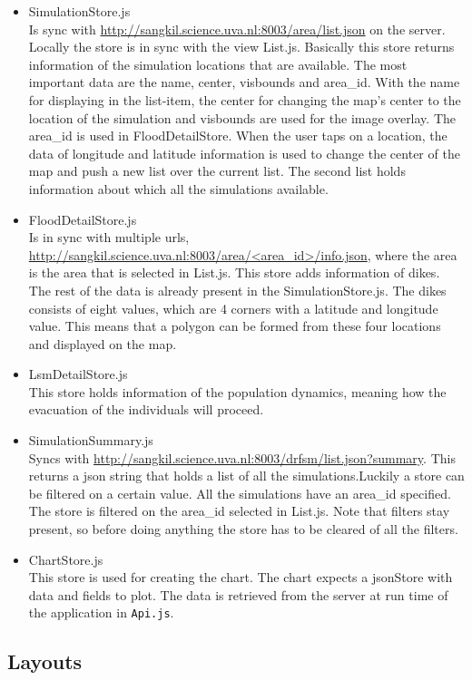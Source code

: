 \begin{itemize}
\item SimulationStore.js \\
Is sync with \url{http://sangkil.science.uva.nl:8003/area/list.json} on the server. Locally the store is in sync with the view List.js. Basically this store returns information of the simulation locations that are available. The most important data are the name, center, visbounds and area\_id. With the name for displaying in the list-item, the center for changing the map's center to the location of the simulation and visbounds are used for the image overlay. The area\_id is used in FloodDetailStore. When the user taps on a location, the data of longitude and latitude information is used to change the center of the map and push a new list over the current list. The second list holds information about which all the simulations available.
\item FloodDetailStore.js \\
Is in sync with multiple urls, \url{http://sangkil.science.uva.nl:8003/area/<area\_id>/info.json}, where the area is the area that is selected in List.js. This store adds information of dikes. The rest of the data is already present in the SimulationStore.js. The dikes consists of eight values, which are 4 corners with a latitude and longitude value. This means that a polygon can be formed from these four locations and displayed on the map.
\item LsmDetailStore.js \\
This store holds information of the population dynamics, meaning how the evacuation of the individuals will proceed. 
\item SimulationSummary.js \\
Syncs with \url{http://sangkil.science.uva.nl:8003/drfsm/list.json?summary}. This returns a json string that holds a list of all the simulations.Luckily a store can be filtered on a certain value. All the simulations have an area\_id specified. The store is filtered on the area\_id selected in List.js. Note that filters stay present, so before doing anything the store has to be cleared of all the filters.
\item ChartStore.js \\
This store is used for creating the chart. The chart expects a jsonStore with data and fields to plot. The data is retrieved from the server at run time of the application in \texttt{Api.js}.
\end{itemize}
\subsection{Layouts}

